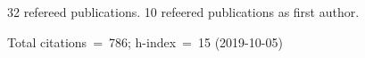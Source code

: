 32 refereed publications. 10 refeered publications as first author.

Total citations~=~786; h-index~=~15 (2019-10-05)
